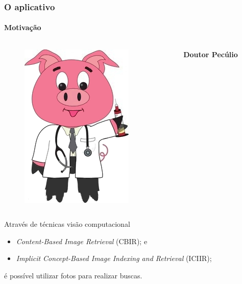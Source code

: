 \documentclass[14pt,beamer]{beamer}
\begin{document}
\begin{frame}
	\frametitle{O aplicativo}
    \framesubtitle{Motivação}
	
	\vspace{-30px}
	\begin{columns}
		\begin{column}{.3\textwidth}
			\begin{figure}
				\includegraphics[scale=.15]{imagens/docpig}
			\end{figure}
		\end{column}%
		\hfill%
		\begin{column}{9\textwidth}
			\large{\textbf{Doutor Pecúlio}}
		\end{column}%
	\end{columns}
	
	\vspace{20px}
	Através de técnicas visão computacional
            \begin{itemize}
            \item \emph{Content-Based Image Retrieval} (CBIR); e
            \item \emph{Implicit Concept-Based Image Indexing and Retrieval} (ICIIR);
            \end{itemize}
    é possível utilizar fotos para realizar buscas.
\end{frame}
\end{document}
